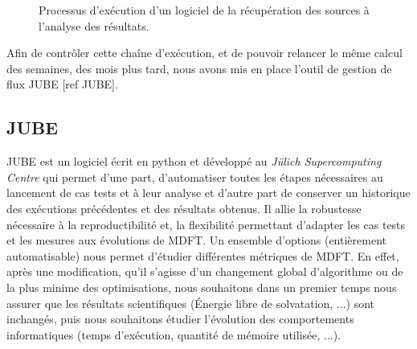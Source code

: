 \begin{figure}[H]
  \center
  \caption{Processus d'exécution d'un logiciel de la récupération des sources à l'analyse des résultats.}
  \label{fig:JUBE_process}
\end{figure}

Afin de contrôler cette chaîne d’exécution, et de pouvoir relancer le même calcul des semaines, des mois plus tard, nous avons mis en place l’outil de gestion de flux JUBE [ref JUBE].

\subsection{JUBE}
JUBE est un logiciel écrit en python et développé au \textit{Jülich Supercomputing Centre} qui permet d'une part, d'automatiser toutes les étapes nécessaires au lancement de cas tests et à leur analyse et d'autre part de conserver un historique des exécutions précédentes et des résultats obtenus. Il allie la robustesse nécessaire à la reproductibilité et, la flexibilité permettant d'adapter les cas tests et les mesures aux évolutions de MDFT. Un ensemble d'options (entièrement automatisable) nous permet d'étudier différentes métriques de MDFT. En effet, après une modification, qu'il s'agisse d'un changement global d'algorithme ou de la plus minime des optimisations, nous souhaitons dans un premier temps nous assurer que les résultats scientifiques (\'Energie libre de solvatation, ...) sont inchangés, puis nous souhaitons étudier l'évolution des comportements informatiques (temps d'exécution, quantité de mémoire utilisée, ...).

